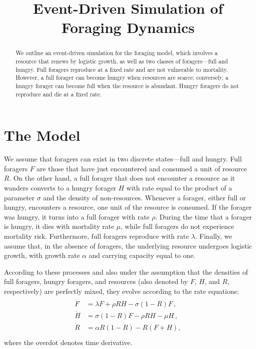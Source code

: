 \documentclass[11pt]{iopart}
\begin{document}
\title{Event-Driven Simulation of Foraging Dynamics}


\begin{abstract}

  We outline an event-driven simulation for the foraging model, which
  involves a resource that renews by logistic growth, as well as two classes
  of foragers---full and hungry.  Full foragers reproduce at a fixed rate and
  are not vulnerable to mortality.  However, a full forager can become hungry
  when resources are scarce; conversely, a hungry forager can become full
  when the resource is abundant.  Hungry foragers do not reproduce and die at
  a fixed rate.
\end{abstract}


\section{The Model}

We assume that foragers can exist in two discrete states---full and hungry.
Full foragers $F$ are those that have just encountered and consumed a unit of
resource $R$.  On the other hand, a full forager that does not encounter a
resource as it wanders converts to a hungry forager $H$ with rate equal to
the product of a parameter $\sigma$ and the density of non-resources.
Whenever a forager, either full or hungry, encounters a resource, one unit of
the resource is consumed.  If the forager was hungry, it turns into a full
forager with rate $\rho$.  During the time that a forager is hungry, it dies
with mortality rate $\mu$, while full foragers do not experience mortality
risk.  Furthermore, full foragers reproduce with rate $\lambda$.  Finally, we
assume that, in the absence of foragers, the underlying resource undergoes
logistic growth, with growth rate $\alpha$ and carrying capacity equal to
one.

According to these processes and also under the assumption that the densities
of full foragers, hungry foragers, and resources (also denoted by $F$,
$H$, and $R$, respectively) are perfectly mixed, they evolve according to the
rate equations:
\begin{align}
  \label{RE}
\begin{split}
\dot F &= \lambda F + \rho  RH - \sigma (1-R)F\,,\\
\dot H &= \sigma (1-R)F - \rho RH - \mu H\,, \\
\dot R &= \alpha R(1-R) -  R(F+H),\\
\end{split}
\end{align}
where the overdot denotes time derivative.
\end{document}
